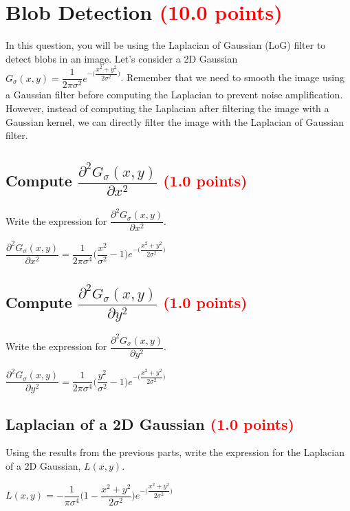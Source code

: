 \documentclass[answers]{exam}
\newcommand{\mypoints}[1]{\textcolor{red}{(#1 points)}}
\begin{document}
\newpage
\section{Blob Detection \mypoints{10.0}}
In this question, you will be using the Laplacian of Gaussian (LoG) filter to detect blobs in an image. Let's consider a 2D Gaussian $G_{\sigma}(x,y) = \dfrac{1}{2\pi \sigma^2} e^{-\big(\dfrac{x^2+y^2}{2\sigma^2}\big)}$. Remember that we need to smooth the image using a Gaussian filter before computing the Laplacian to prevent noise amplification. However, instead of computing the Laplacian after filtering the image with a Gaussian kernel, we can directly filter the image with the Laplacian of Gaussian filter.

\subsection{Compute $\dfrac{\partial^2G_{\sigma}(x,y)}{\partial x^2}$ \mypoints{1.0}}
Write the expression for $\dfrac{\partial ^2G_{\sigma}(x,y)}{\partial x^2}$.
\begin{solution}
$\dfrac{\partial^2G_{\sigma}(x,y)}{\partial x^2} = \dfrac{1}{2\pi \sigma^4}\big(\dfrac{x^2}{\sigma^2} -1\big) e^{-\big(\dfrac{x^2+y^2}{2\sigma^2}\big)}$
\end{solution}

\subsection{Compute $\dfrac{\partial^2G_{\sigma}(x,y)}{\partial y^2}$ \mypoints{1.0}}
Write the expression for $\dfrac{\partial^2G_{\sigma}(x,y)}{\partial y^2}$.
\begin{solution}
$\dfrac{\partial^2G_{\sigma}(x,y)}{\partial y^2} = \dfrac{1}{2\pi \sigma^4}\big(\dfrac{y^2}{\sigma^2} -1\big) e^{-\big(\dfrac{x^2+y^2}{2\sigma^2}\big)}$
\end{solution}

\subsection{Laplacian of a 2D Gaussian \mypoints{1.0}}
Using the results from the previous parts, write the expression for the Laplacian of a 2D Gaussian, $L(x,y)$.
\begin{solution}
$L(x,y) = -\dfrac{1}{\pi \sigma^4}\big(1 - \dfrac{x^2 + y^2}{2\sigma^2}\big) e^{-\big(\dfrac{x^2+y^2}{2\sigma^2}\big)} $
\end{solution}
\end{document}

